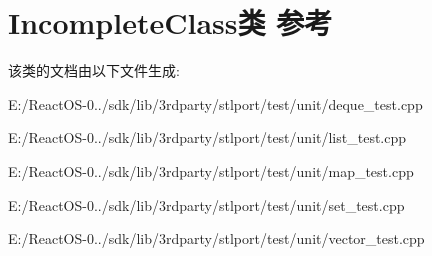 \hypertarget{class_incomplete_class}{}\section{Incomplete\+Class类 参考}
\label{class_incomplete_class}


该类的文档由以下文件生成\+:\begin{DoxyCompactItemize}
\item 
E\+:/\+React\+O\+S-\/0../sdk/lib/3rdparty/stlport/test/unit/deque\+\_\+test.\+cpp\item 
E\+:/\+React\+O\+S-\/0../sdk/lib/3rdparty/stlport/test/unit/list\+\_\+test.\+cpp\item 
E\+:/\+React\+O\+S-\/0../sdk/lib/3rdparty/stlport/test/unit/map\+\_\+test.\+cpp\item 
E\+:/\+React\+O\+S-\/0../sdk/lib/3rdparty/stlport/test/unit/set\+\_\+test.\+cpp\item 
E\+:/\+React\+O\+S-\/0../sdk/lib/3rdparty/stlport/test/unit/vector\+\_\+test.\+cpp\end{DoxyCompactItemize}
